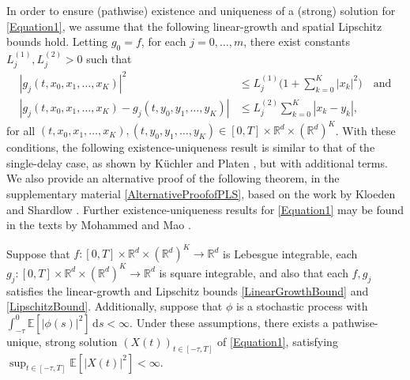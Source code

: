 \documentclass[onefignum]{siamart250211}
\providecommand{\abs}[1]{\left|#1\right|}
\begin{document}
In order to ensure (pathwise) existence and uniqueness of a (strong) solution for \cref{Equation1}, we assume that the following linear-growth and spatial Lipschitz bounds hold. Letting $g_0=f$, for each $j=0,\ldots,m$, there exist constants $L_j^{(1)},L_j^{(2)}>0$ such that
\begin{align}\abs{g_j(t,x_0,x_1,\ldots,x_K)}^2&\leqslant L_j^{(1)}\bigg(1+\sum_{k=0}^K\abs{x_k}^2\bigg)\quad\textrm{and}\label{LinearGrowthBound}\\
\abs{g_j(t,x_0,x_1,\ldots,x_K)-g_j(t,y_0,y_1,\ldots,y_K)}&\leqslant L_j^{(2)}\sum_{k=0}^K\abs{x_k-y_k},\label{LipschitzBound}\end{align}
for all $(t,x_0,x_1,\ldots,x_K),(t,y_0,y_1,\ldots,y_K)\in[0,T]\times\mathbb{R}^d\times(\mathbb{R}^d)^K$. With these conditions, the following existence-uniqueness result is similar to that of the single-delay case, as shown by K\"uchler and Platen \cite{KuchlerPlaten2000}, but with additional terms. We also provide an alternative proof of the following theorem, in the supplementary material \cref{AlternativeProofofPLS}, based on the work by Kloeden and Shardlow \cite{KloedenShardlow2012}. Further existence-uniqueness results for \cref{Equation1} may be found in the texts by Mohammed \cite{Mohammed1998} and Mao \cite{Mao2007}.

\begin{theorem}\label{PLS}
Suppose that $f:[0,T]\times\mathbb{R}^d\times(\mathbb{R}^d)^K\to\mathbb{R}^d$ is Lebesgue integrable, each $g_j:[0,T]\times\mathbb{R}^d\times(\mathbb{R}^d)^K\to\mathbb{R}^d$ is square integrable, and also that each $f,g_j$ satisfies the linear-growth and Lipschitz bounds \cref{LinearGrowthBound} and \cref{LipschitzBound}. Additionally, suppose that $\phi$ is a stochastic process with $\int_{-\tau}^0\mathbb{E}[\abs{\phi(s)}^2]\,\mathrm{d}s<\infty$. Under these assumptions, there exists a pathwise-unique, strong solution $(X(t))_{t\in[-\tau,T]}$ of \cref{Equation1}, satisfying $\sup_{t\in[-\tau,T]}\mathbb{E}[\abs{X(t)}^2]<\infty$.
\end{theorem}


\end{document}
